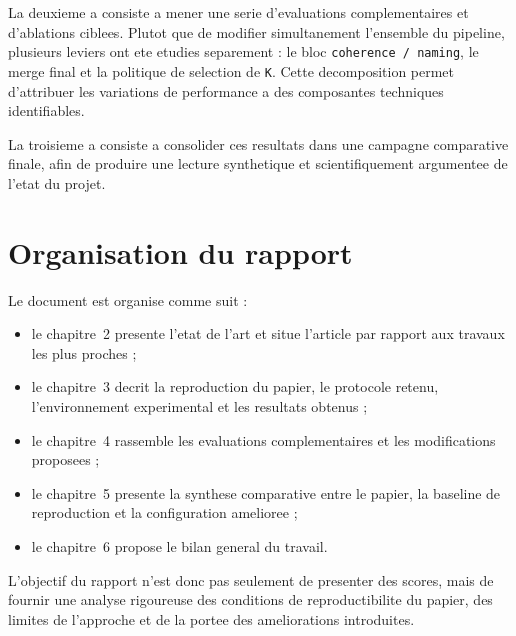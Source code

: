La deuxieme a consiste a mener une serie d'evaluations complementaires et
d'ablations ciblees. Plutot que de modifier simultanement l'ensemble du
pipeline, plusieurs leviers ont ete etudies separement : le bloc
\texttt{coherence / naming}, le merge final et la politique de selection de
\texttt{K}. Cette decomposition permet d'attribuer les variations de
performance a des composantes techniques identifiables.

La troisieme a consiste a consolider ces resultats dans une campagne
comparative finale, afin de produire une lecture synthetique et scientifiquement
argumentee de l'etat du projet.

\section{Organisation du rapport}

Le document est organise comme suit :
\begin{itemize}[leftmargin=*]
  \item le chapitre~2 presente l'etat de l'art et situe l'article par rapport
  aux travaux les plus proches ;
  \item le chapitre~3 decrit la reproduction du papier, le protocole retenu,
  l'environnement experimental et les resultats obtenus ;
  \item le chapitre~4 rassemble les evaluations complementaires et les
  modifications proposees ;
  \item le chapitre~5 presente la synthese comparative entre le papier, la
  baseline de reproduction et la configuration amelioree ;
  \item le chapitre~6 propose le bilan general du travail.
\end{itemize}

L'objectif du rapport n'est donc pas seulement de presenter des scores, mais de
fournir une analyse rigoureuse des conditions de reproductibilite du papier,
des limites de l'approche et de la portee des ameliorations introduites.
